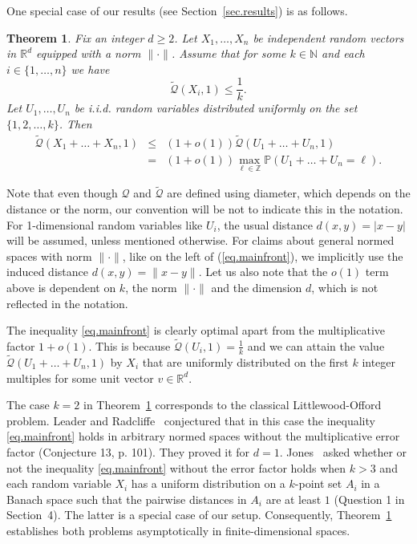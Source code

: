 \documentclass{article}
\newtheorem{theorem}{Theorem}[section]
\newcommand{\conc}{\mathcal{Q}}
\newcommand{\concdiam}{\tilde{\mathcal{Q}}}
\begin{document}
One special case of our results (see Section~\ref{sec.results}) is as follows.
\begin{theorem}\label{thm.front}
    Fix an integer $d \ge 2$.
    Let $X_1, \dots, X_n$ be independent random vectors in $\mathbb{R}^d$ equipped with a norm $\|\cdot\|$. Assume that for some $k\in \mathbb{N}$ and each $i \in \{1, \dots, n\}$ we have 
    $$\concdiam(X_i, 1) \le \frac{1}{k}.$$
Let $U_1,\ldots, U_n$ be i.i.d. random variables distributed uniformly on the set $\{ 1,2,\ldots,k\}$.
    Then
    \begin{eqnarray}
\concdiam(X_1 + \dots + X_n, 1) &\le& 
        (1 + o(1)) \concdiam\left(U_1 + \dots + U_n, 1\right)
        \label{eq.mainfront}
        \\&=& 
        (1 + o(1))\max_{\ell \in \mathbb{Z}}\mathbb{P}\left(U_1 + \dots + U_n=\ell\right).
        \nonumber
    \end{eqnarray}
\end{theorem}
Note that even though $\conc$ and $\concdiam$ are defined using diameter, which depends
on the distance or the norm, our convention will be not to indicate 
this in the notation. For 1-dimensional random variables like $U_i$, 
the usual distance $d(x,y) = |x-y|$ will be assumed, unless mentioned otherwise. For claims about general
normed spaces with norm $\|\cdot\|$, like on the left of (\ref{eq.mainfront}),
we implicitly use the induced distance $d(x,y) = \|x-y\|$. 
Let us also note that the $o(1)$ term above is dependent on $k$, the norm $\|\cdot\|$ and the dimension $d$, which is not reflected in the notation. 

The inequality 
\eqref{eq.mainfront} is clearly optimal apart from the multiplicative factor $1+o(1)$. This is because $\concdiam(U_i,1)=\frac{1}{k}$ and we can attain the value $\concdiam(U_1+\ldots+U_n, 1)$ by $X_i$ that 
are uniformly distributed on the first $k$ integer multiples 
for some unit vector $v \in \mathbb{R}^d$. 

The case $k=2$ in Theorem~\ref{thm.front} corresponds to the classical Littlewood-Offord problem.
Leader and Radcliffe~\cite{LR} conjectured that in this case the inequality \eqref{eq.mainfront} holds in arbitrary normed spaces without the multiplicative error factor (Conjecture 13, p. 101). They proved it for $d=1$. 
Jones~\cite{jones} asked whether or not the inequality \eqref{eq.mainfront} without the error factor holds when $k>3$ 
and each random variable $X_i$ has a uniform distribution on a $k$-point set $A_i$
in a Banach space such that the pairwise distances in $A_i$ are at least $1$ (Question 1 in Section~4). The latter is a special case of our setup. Consequently, Theorem~\ref{thm.front} establishes both problems asymptotically in finite-dimensional spaces.
\end{document}
